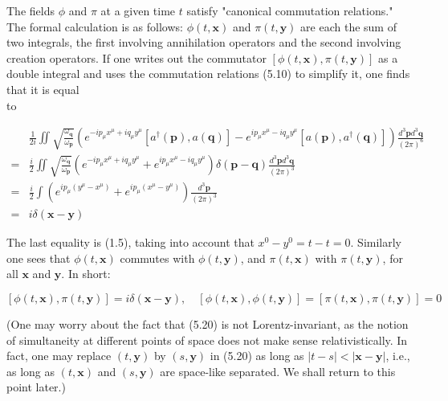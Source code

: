 \documentclass[10pt, letterpaper]{article}
\begin{document}
The fields $\phi$ and $\pi$ at a given time $t$ satisfy "canonical commutation relations." The formal calculation is as follows: $\phi(t, \mathbf{x})$ and $\pi(t, \mathbf{y})$ are each the sum of two integrals, the first involving annihilation operators and the second involving creation operators. If one writes out the commutator $[\phi(t, \mathbf{x}), \pi(t, \mathbf{y})]$ as a double integral and uses the commutation relations (5.10) to simplify it, one finds that it is equal\\
to

$$
\begin{aligned}
& \frac{1}{2 i} \iint \sqrt{\frac{\omega_{\mathbf{q}}}{\omega_{\mathbf{p}}}}\left(e^{-i p_{\mu} x^{\mu}+i q_{\mu} y^{\mu}}\left[a^{\dagger}(\mathbf{p}), a(\mathbf{q})\right]-e^{i p_{\mu} x^{\mu}-i q_{\mu} y^{\mu}}\left[a(\mathbf{p}), a^{\dagger}(\mathbf{q})\right]\right) \frac{d^{3} \mathbf{p} d^{3} \mathbf{q}}{(2 \pi)^{6}} \\
= & \frac{i}{2} \iint \sqrt{\frac{\omega_{\mathbf{q}}}{\omega_{\mathbf{p}}}}\left(e^{-i p_{\mu} x^{\mu}+i q_{\mu} y^{\mu}}+e^{i p_{\mu} x^{\mu}-i q_{\mu} y^{\mu}}\right) \delta(\mathbf{p}-\mathbf{q}) \frac{d^{3} \mathbf{p} d^{3} \mathbf{q}}{(2 \pi)^{3}} \\
= & \frac{i}{2} \int\left(e^{i p_{\mu}\left(y^{\mu}-x^{\mu}\right)}+e^{i p_{\mu}\left(x^{\mu}-y^{\mu}\right)}\right) \frac{d^{3} \mathbf{p}}{(2 \pi)^{3}} \\
= & i \delta(\mathbf{x}-\mathbf{y})
\end{aligned}
$$

The last equality is (1.5), taking into account that $x^{0}-y^{0}=t-t=0$. Similarly one sees that $\phi(t, \mathbf{x})$ commutes with $\phi(t, \mathbf{y})$, and $\pi(t, \mathbf{x})$ with $\pi(t, \mathbf{y})$, for all $\mathbf{x}$ and $\mathbf{y}$. In short:

$$
[\phi(t, \mathbf{x}), \pi(t, \mathbf{y})]=i \delta(\mathbf{x}-\mathbf{y}), \quad[\phi(t, \mathbf{x}), \phi(t, \mathbf{y})]=[\pi(t, \mathbf{x}), \pi(t, \mathbf{y})]=0
$$

(One may worry about the fact that (5.20) is not Lorentz-invariant, as the notion of simultaneity at different points of space does not make sense relativistically. In fact, one may replace $(t, \mathbf{y})$ by $(s, \mathbf{y})$ in (5.20) as long as $|t-s|<|\mathbf{x - y}|$, i.e., as long as $(t, \mathbf{x})$ and $(s, \mathbf{y})$ are space-like separated. We shall return to this point later.)
\end{document}
